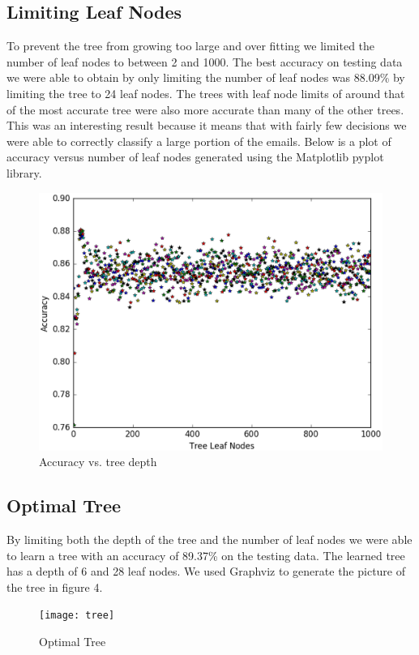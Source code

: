 \documentclass{article} %
\begin{document}
\subsection{Limiting Leaf Nodes}
To prevent the tree from growing too large and over fitting we limited the number
of leaf nodes to between 2 and 1000. The best accuracy on testing data we were
able to obtain by only limiting the number of leaf nodes was 88.09\% by limiting
the tree to 24 leaf nodes. The trees with leaf node limits of around that of
the most accurate tree were also more accurate than many of the other trees.
This was an interesting result because it means that with fairly few decisions
we were able to correctly classify a large portion of the emails. Below is a
plot of accuracy versus number of leaf nodes generated using the Matplotlib pyplot\cite{pyplot} library.
\begin{figure}[H]
\includegraphics[scale=.5]{accuracy-vs-nodes}
\caption{Accuracy vs. tree depth}
\end{figure}


\subsection{Optimal Tree}
By limiting both the depth of the tree and the number of leaf nodes we were able to learn a tree with an accuracy of 89.37\% on the testing data. The learned tree has a depth of 6 and 28 leaf nodes. We used Graphviz\cite{graphviz} to generate the picture of the tree in figure 4.
\begin{figure}[H]
\texttt{[image: tree]}
\caption{Optimal Tree}
\end{figure}
\end{document}
